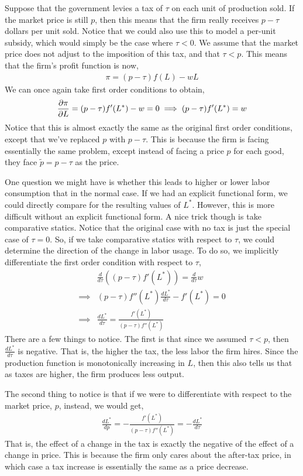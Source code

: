 Suppose that the government levies a tax of $\tau$ on each unit of production sold. If the market price is still $p$, then this means that the firm really receives $p - \tau$ dollars per unit sold. Notice that we could also use this to model a per-unit subsidy, which would simply be the case where $\tau < 0$. We assume that the market price does not adjust to the imposition of this tax, and that $\tau < p$.  This means that the firm's profit function is now,
\begin{align*}
    \pi = (p - \tau) f(L) - w L
\end{align*}
We can once again take first order conditions to obtain,
\begin{align*}
    \frac{\partial \pi}{\partial L} = (p - \tau) f'(L^*) - w = 0 \implies (p - \tau) f'(L^*) = w
\end{align*}
Notice that this is almost exactly the same as the original first order conditions, except that we've replaced $p$ with $p - \tau$. This is because the firm is facing essentially the same problem, except instead of facing a price $p$ for each good, they face $\tilde{p} = p - \tau$ as the price. 

One question we might have is whether this leads to higher or lower labor consumption that in the normal case. If we had an explicit functional form, we could directly compare for the resulting values of $L^*$. However, this is more difficult without an explicit functional form. A nice trick though is take comparative statics. Notice that the original case with no tax is just the special case of $\tau = 0$. So, if we take comparative statics with respect to $\tau$, we could determine the direction of the change in labor usage. To do so, we implicitly differentiate the first order condition with respect to $\tau$,
\begin{align*}
    &\frac{d}{d\tau}\left((p - \tau) f'(L^*)\right) = \frac{d}{d\tau} w \\
    \implies& (p - \tau) f''(L^*) \frac{dL^*}{d\tau}- f'(L^*) = 0 \\
    \implies& \frac{dL^*}{d\tau} = \frac{f'(L^*)}{(p - \tau) f''(L^*)} 
\end{align*}
There are a few things to notice. The first is that since we assumed $\tau < p$, then $\frac{dL^*}{d\tau}$ is negative. That is, the higher the tax, the less labor the firm hires. Since the production function is monotonically increasing in $L$, then this also tells us that as taxes are higher, the firm produces less output.

The second thing to notice is that if we were to differentiate with respect to the market price, $p$, instead, we would get,
\begin{align*}
    \frac{dL^*}{dp} = - \frac{f'(L^*)}{(p - \tau) f''(L^*)} = -\frac{dL^*}{d\tau}
\end{align*}
That is, the effect of a change in the tax is exactly the negative of the effect of a change in price. This is because the firm only cares about the after-tax price, in which case a tax increase is essentially the same as a price decrease.


